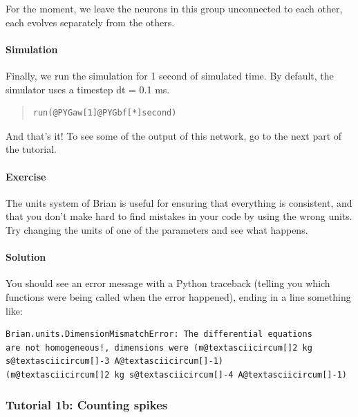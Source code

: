 \documentclass[letterpaper,10pt,english]{manual}
\begin{document}
For the moment, we leave the neurons in this group unconnected
to each other, each evolves separately from the others.


\paragraph{Simulation}

Finally, we run the simulation for 1 second of simulated time.
By default, the simulator uses a timestep dt = 0.1 ms.
\begin{quote}

\begin{Verbatim}[commandchars=@\[\]]
run(@PYGaw[1]@PYGbf[*]second)
\end{Verbatim}
\end{quote}

And that's it! To see some of the output of this network, go
to the next part of the tutorial.


\paragraph{Exercise}

The units system of Brian is useful for ensuring that everything
is consistent, and that you don't make hard to find mistakes in
your code by using the wrong units. Try changing the units of one
of the parameters and see what happens.


\paragraph{Solution}

You should see an error message with a Python traceback (telling
you which functions were being called when the error happened),
ending in a line something like:

\begin{Verbatim}[commandchars=@\[\]]
Brian.units.DimensionMismatchError: The differential equations
are not homogeneous!, dimensions were (m@textasciicircum[]2 kg s@textasciicircum[]-3 A@textasciicircum[]-1)
(m@textasciicircum[]2 kg s@textasciicircum[]-4 A@textasciicircum[]-1)
\end{Verbatim}

\resetcurrentobjects
\hypertarget{--doc-tutorial_1b_counting_spikes}{}

\subsubsection{Tutorial 1b: Counting spikes}
\end{document}
